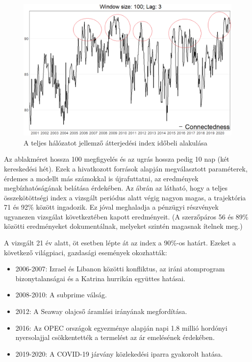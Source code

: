 \documentclass[12pt,bibliography=totoc]{article}
\begin{document}
\begin{figure}[H]
\caption{A teljes hálózatot jellemző átterjedési index időbeli alakulása}
\includegraphics[width=11.5cm]{connectedness}
\centering
\end{figure}

Az ablakméret hossza 100 megfigyelés és az ugrás hossza pedig 10 nap (két kereskedési hét). Ezek a hivatkozott források alapján megválasztott paraméterek, érdemes a modellt más számokkal is újrafuttatni, az eredmények megbízhatóságának belátása érdekében. Az ábrán az látható, hogy a teljes összekötöttségi index a vizsgált periódus alatt végig nagyon magas, a trajektória 71 és 92\% között ingadozik. Ez jóval meghaladja a \cite{diebold2012better} pénzügyi részvények ugyanezen vizsgálat következtében kapott eredményeit. (A szerzőpáros 56 és 89\% közötti eredményeket dokumentálnak, melyeket szintén magasnak ítelnek meg.) 

A vizsgált 21 év alatt, öt esetben lépte át az index a 90\%-os határt. Ezeket a következő világpiaci, gazdasági események okozhatták:

\begin{itemize}
\item 2006-2007: Izrael és Libanon közötti konfliktus, az iráni atomprogram bizonytalanságai és a Katrina hurrikán együttes hatásai.
\item 2008-2010: A subprime válság.
\item 2012: A Seaway olajcső áramlási irányának megfordítása.
\item 2016: Az OPEC országok egyezménye alapján napi 1.8 millió hordónyi nyersolajjal csökkentették a termelést az ár emelésének érdekében.
\item 2019-2020: A COVID-19 járvány közlekedési iparra gyakorolt hatása.
\end{itemize}
\end{document}
